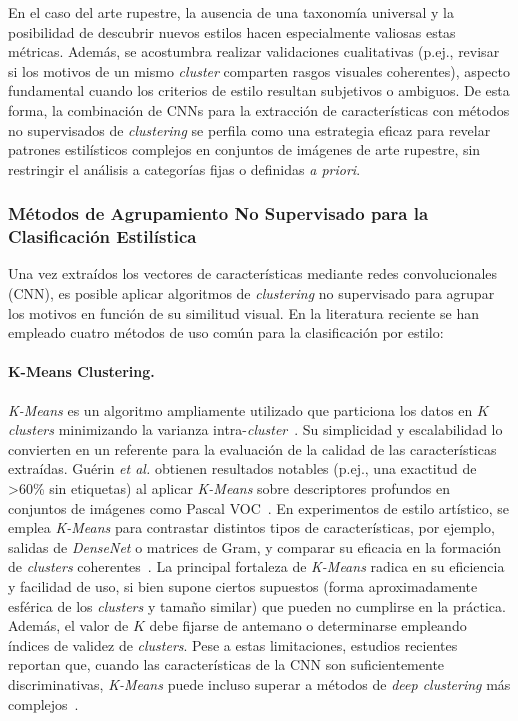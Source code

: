 En el caso del arte rupestre, la ausencia de una taxonomía universal y la posibilidad de descubrir nuevos estilos hacen especialmente valiosas estas métricas.
Además, se acostumbra realizar validaciones cualitativas (p.ej., revisar si los motivos de un mismo \textit{cluster} comparten rasgos visuales coherentes), aspecto fundamental cuando los criterios de estilo resultan subjetivos o ambiguos.
De esta forma, la combinación de CNNs para la extracción de características con métodos no supervisados de \textit{clustering} se perfila como una estrategia eficaz para revelar patrones estilísticos complejos en conjuntos de imágenes de arte rupestre, sin restringir el análisis a categorías fijas o definidas \textit{a priori}.

\subsubsection{Métodos de Agrupamiento No Supervisado para la Clasificación Estilística }

Una vez extraídos los vectores de características mediante redes convolucionales (CNN), es posible aplicar algoritmos de \textit{clustering} no supervisado para agrupar los motivos en función de su similitud visual.
En la literatura reciente se han empleado cuatro métodos de uso común para la clasificación por estilo:

\paragraph{K-Means Clustering.}
\textit{K-Means} es un algoritmo ampliamente utilizado que particiona los datos en $K$ \textit{clusters} minimizando la varianza intra-\textit{cluster}~\cite{guerin2018,dangeti2024}.
Su simplicidad y escalabilidad lo convierten en un referente para la evaluación de la calidad de las características extraídas. Guérin \textit{et al.} obtienen resultados notables (p.ej., una exactitud de \textgreater 60\% sin etiquetas) al aplicar \textit{K-Means} sobre descriptores profundos en conjuntos de imágenes como Pascal VOC~\cite{guerin2018}.
En experimentos de estilo artístico, se emplea \textit{K-Means} para contrastar distintos tipos de características, por ejemplo, salidas de \textit{DenseNet} o matrices de Gram, y comparar su eficacia en la formación de \textit{clusters} coherentes~\cite{dangeti2024}.
La principal fortaleza de \textit{K-Means} radica en su eficiencia y facilidad de uso, si bien supone ciertos supuestos (forma aproximadamente esférica de los \textit{clusters} y tamaño similar) que pueden no cumplirse en la práctica.
Además, el valor de $K$ debe fijarse de antemano o determinarse empleando índices de validez de \textit{clusters}.
Pese a estas limitaciones, estudios recientes reportan que, cuando las características de la CNN son suficientemente discriminativas, \textit{K-Means} puede incluso superar a métodos de \textit{deep clustering} más complejos~\cite{dangeti2024}.

